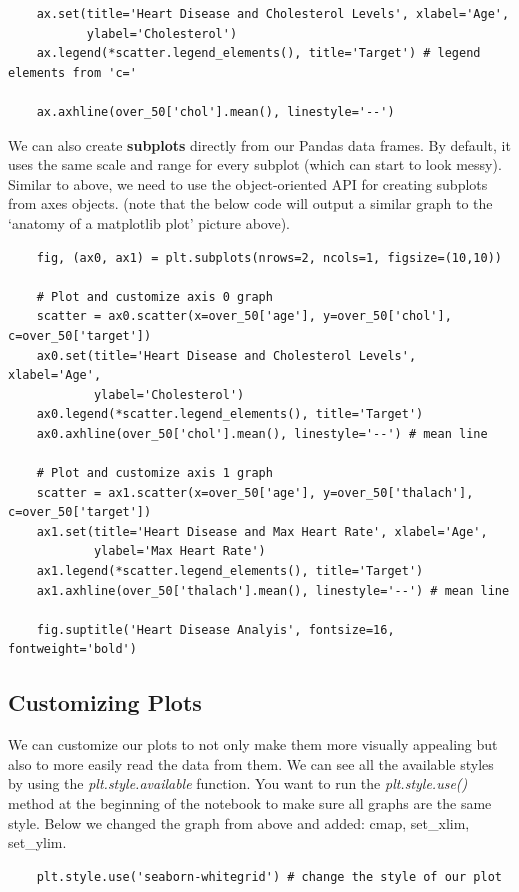 \documentclass[11pt, a4paper]{article}
\begin{document}
\begin{spacing}{1.1}
\begin{lstlisting}
	ax.set(title='Heart Disease and Cholesterol Levels', xlabel='Age', 
	       ylabel='Cholesterol')       
	ax.legend(*scatter.legend_elements(), title='Target') # legend elements from 'c='
	
	ax.axhline(over_50['chol'].mean(), linestyle='--') \end{lstlisting} \newpage

	\noindent We can also create \textbf{subplots} directly from our Pandas data frames. By default, it uses the same scale and range for every subplot (which can start to look messy). Similar to above, we need to use the object-oriented API for creating subplots from axes objects. (note that the below code will output a similar graph to the `anatomy of a matplotlib plot' picture above). 
	\begin{lstlisting}
	fig, (ax0, ax1) = plt.subplots(nrows=2, ncols=1, figsize=(10,10))
	
	# Plot and customize axis 0 graph
	scatter = ax0.scatter(x=over_50['age'], y=over_50['chol'], c=over_50['target'])
	ax0.set(title='Heart Disease and Cholesterol Levels', xlabel='Age', 
	        ylabel='Cholesterol')
	ax0.legend(*scatter.legend_elements(), title='Target')      
	ax0.axhline(over_50['chol'].mean(), linestyle='--') # mean line
	
	# Plot and customize axis 1 graph
	scatter = ax1.scatter(x=over_50['age'], y=over_50['thalach'], c=over_50['target'])
	ax1.set(title='Heart Disease and Max Heart Rate', xlabel='Age', 
	        ylabel='Max Heart Rate')
	ax1.legend(*scatter.legend_elements(), title='Target')      
	ax1.axhline(over_50['thalach'].mean(), linestyle='--') # mean line 
	
	fig.suptitle('Heart Disease Analyis', fontsize=16, fontweight='bold') \end{lstlisting} \vspace*{1mm}
	
	\subsection{Customizing Plots}
	We can customize our plots to not only make them more visually appealing but also to more easily read the data from them. We can see all the available styles by using the \textit{plt.style.available} function. You want to run the \textit{plt.style.use()} method at the beginning of the notebook to make sure all graphs are the same style. Below we changed the graph from above and added: cmap, set\_xlim, set\_ylim.
	\begin{lstlisting}
	plt.style.use('seaborn-whitegrid') # change the style of our plot
	

\end{lstlisting}
\end{spacing}
\end{document}
